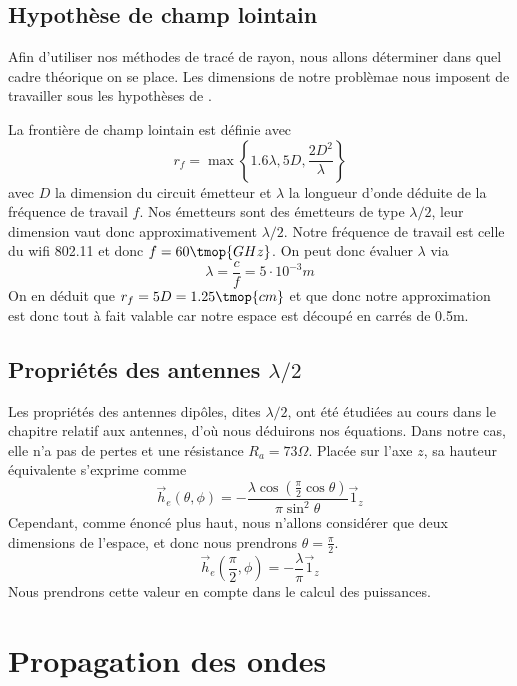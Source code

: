 \subsection{Hypoth{\`e}se de champ lointain}

Afin d'utiliser nos m{\'e}thodes de trac{\'e} de rayon, nous allons
d{\'e}terminer dans quel cadre th{\'e}orique on se place. Les dimensions de
notre probl{\`e}mae nous imposent de travailler sous les hypoth{\`e}ses de
.

La fronti{\`e}re de champ lointain est d{\'e}finie avec
\[ r_f = \max \left\{ 1.6 \lambda, 5 D, \frac{2 D^2}{\lambda} \right\} \]
avec $D$ la dimension du circuit {\'e}metteur et $\lambda$ la longueur d'onde
d{\'e}duite de la fr{\'e}quence de travail $f$. Nos {\'e}metteurs sont des
{\'e}metteurs de type $\lambda / 2$, leur dimension vaut donc
approximativement $\lambda / 2$. Notre fr{\'e}quence de travail est celle du
wifi 802.11 et donc $f = 60 \tmop{GHz}$. On peut donc {\'e}valuer $\lambda$
via
\[ \lambda = \frac{c}{f} = 5 \cdot 10^{- 3} m \]
On en d{\'e}duit que $r_f = 5 D = 1.25 \tmop{cm}$ et que donc notre
approximation est donc tout {\`a} fait valable car notre espace est
d{\'e}coup{\'e} en carr{\'e}s de 0.5m.

\subsection{Propri{\'e}t{\'e}s des antennes $\lambda / 2$}

Les propri{\'e}t{\'e}s des antennes dip{\^o}les, dites $\lambda / 2$, ont
{\'e}t{\'e} {\'e}tudi{\'e}es au cours dans le chapitre relatif aux antennes,
d'o{\`u} nous d{\'e}duirons nos {\'e}quations. Dans notre cas, elle n'a pas de
pertes et une r{\'e}sistance $R_a = 73 \Omega$. Plac{\'e}e sur l'axe $z$, sa
hauteur {\'e}quivalente s'exprime comme
\[ \vec{h}_e (\theta, \phi) = - \frac{\lambda \cos \left( \frac{\pi}{2} \cos
   \theta \right)}{\pi \sin^2 \theta} \vec{1}_z \]
Cependant, comme {\'e}nonc{\'e} plus haut, nous n'allons consid{\'e}rer que
deux dimensions de l'espace, et donc nous prendrons $\theta = \frac{\pi}{2}$.
\[ \vec{h}_e \left( \frac{\pi}{2}, \phi \right) = - \frac{\lambda}{\pi}
   \vec{1}_z \]
Nous prendrons cette valeur en compte dans le calcul des puissances.

\section{Propagation des ondes}

